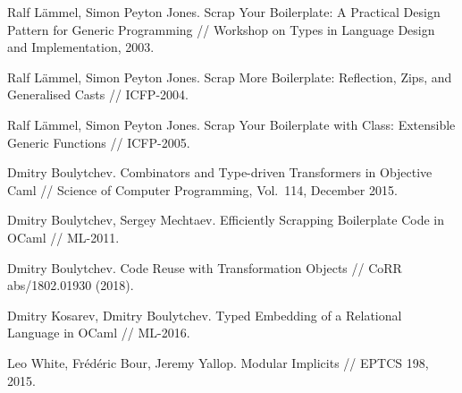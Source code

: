 \documentclass[twocolumn,8pt]{extarticle}
\begin{document}
{\begin{thebibliography}{99}
Ralf L\"ammel, Simon Peyton Jones.
Scrap Your Boilerplate: A Practical Design Pattern for Generic Programming //
Workshop on Types in Language Design and Implementation, 2003.

Ralf L\"ammel, Simon Peyton Jones.
Scrap More Boilerplate: Reflection, Zips, and Generalised Casts //
ICFP-2004.

Ralf L\"ammel, Simon Peyton Jones.
Scrap Your Boilerplate with Class: Extensible Generic Functions //
ICFP-2005.

Dmitry Boulytchev. Combinators and Type-driven Transformers in Objective Caml // Science of
Computer Programming, Vol.~114, December 2015.

Dmitry Boulytchev, Sergey Mechtaev.
Efficiently Scrapping Boilerplate Code in OCaml // ML-2011.

Dmitry Boulytchev.
Code Reuse with Transformation Objects // CoRR abs/1802.01930 (2018).  

Dmitry Kosarev, Dmitry Boulytchev.
Typed Embedding of a Relational Language in OCaml // ML-2016.

Leo White, Fr\'ed\'eric Bour, Jeremy Yallop. Modular Implicits // EPTCS 198, 2015.
\end{thebibliography}
}
\end{document}
